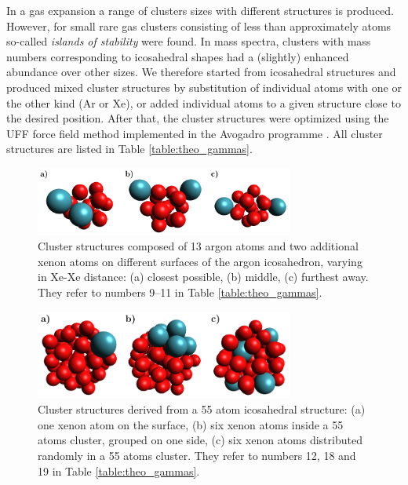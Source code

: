 In a gas expansion a range of clusters sizes with different structures is produced. 
However, for small rare gas clusters consisting of less than approximately \unit[1000]{atoms} so-called \emph{islands of stability} were found.\cite{haberland}  
In mass spectra, clusters with mass numbers corresponding to icosahedral shapes had a (slightly) enhanced abundance over other sizes. 
We therefore started from icosahedral structures and produced mixed cluster structures by substitution of individual atoms with one or the other kind (Ar or Xe), or added individual atoms to a given structure close to the desired position. 
After that, the cluster structures were optimized using the UFF force field method \cite{} implemented in the 
Avogadro programme \cite{}.
All cluster structures are listed in Table \ref{table:theo_gammas}.
%
\begin{figure}[ht]
 \centering
 \includegraphics[width=8.5cm]{pics/cluster_2_overview.pdf}
 \caption{Cluster structures composed of 13 argon atoms and two additional xenon
          atoms on different surfaces of the argon icosahedron, varying in Xe-Xe distance:
          (a) closest possible, (b) middle, (c) furthest away. They refer to
          numbers 9--11 in Table \ref{table:theo_gammas}.}
 \label{figure:cluster_2_overview}
\end{figure}
%
\begin{figure}[h]
 \centering
 \includegraphics[width=8.5cm]{pics/cluster_3_overview.pdf}
 \caption{Cluster structures derived from a 55 atom icosahedral structure:
          (a) one xenon atom on the surface, (b) six xenon atoms inside a 55 atoms cluster,
          grouped on one side, (c) six xenon atoms distributed randomly
          in a 55 atoms cluster. They refer to numbers 12, 18 and 19
          in Table \ref{table:theo_gammas}.}
 \label{figure:cluster_3_overview}
\end{figure}


